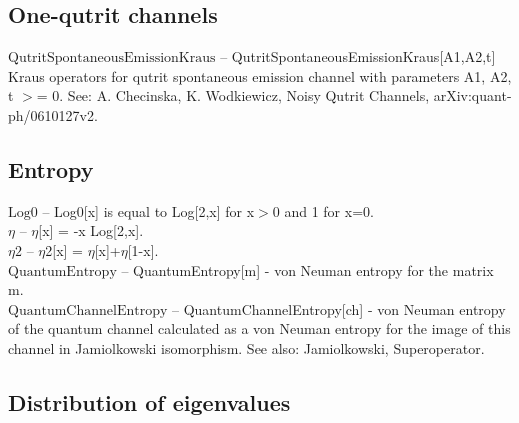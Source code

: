 \subsection{One-qutrit channels}

\noindent\textbf{$ \text{QutritSpontaneousEmissionKraus} $ }-- QutritSpontaneousEmissionKraus[A1,A2,t] Kraus operators for qutrit spontaneous emission channel with parameters A1, A2, t $>$= 0. See: A. Checinska, K. Wodkiewicz, Noisy Qutrit Channels, arXiv:quant-ph/0610127v2.$  $\\
\subsection{Entropy}

\noindent\textbf{$ \text{Log0} $ }-- Log0[x] is equal to Log[2,x] for x$>$0 and 1 for x=0.$  $\\
\noindent\textbf{$ \eta  $ }-- $\eta $[x] = -x Log[2,x].$  $\\
\noindent\textbf{$ \text{$\eta $2} $ }-- $\eta $2[x] = $\eta $[x]+$\eta $[1-x].$  $\\
\noindent\textbf{$ \text{QuantumEntropy} $ }-- QuantumEntropy[m] - von Neuman entropy for the matrix m.$  $\\
\noindent\textbf{$ \text{QuantumChannelEntropy} $ }-- QuantumChannelEntropy[ch] - von Neuman entropy of the quantum channel calculated as a von Neuman entropy for the image of this channel in Jamiolkowski isomorphism. See also: Jamiolkowski, Superoperator.$  $\\
\subsection{Distribution of eigenvalues}

